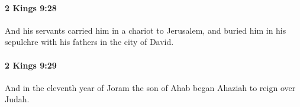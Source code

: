 		\paragraph{2 Kings 9:28} %
			\label{2KINGS-9-28}

			And his servants carried him in a chariot to Jerusalem, and buried him in his sepulchre with his fathers in the city of David.


		\paragraph{2 Kings 9:29} %
			\label{2KINGS-9-29}

			And in the eleventh year of Joram the son of Ahab began Ahaziah to reign over Judah.


